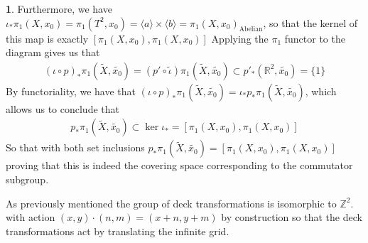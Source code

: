 \documentclass[10.5pt]{article}
\theoremstyle{definition}
\newtheorem{pb}{}
\newcommand{\set}[1]{\{#1\}}
\newcommand{\gen}[1]{\langle #1 \rangle}
\begin{document}
\begin{pb}
        Furthermore, we have \(\iota_*\pi_1(X,x_0) = \pi_1(T^2,x_0) = \gen{a} \times \gen{b} = \pi_1(X,x_0)_{\text{Abelian}}\), so that the kernel of this map is exactly \newline \([\pi_1(X,x_0),\pi_1(X,x_0)]\)
        Applying the \(\pi_1\) functor to the diagram gives us that
        \begin{align*}
            (\iota \circ p)_*\pi_1(\tilde{X},\tilde{x_0}) = (p'\circ \tilde{\iota})\pi_1(\tilde{X},\tilde{x_0}) \subset p'_* (\mathbb{R}^2,\tilde{x_0}) = \set{1}
        \end{align*}
        By functoriality, we have that \( (\iota \circ p)_*\pi_1(\tilde{X},\tilde{x_0}) = \iota_* p_* \pi_1(\tilde{X},\tilde{x_0})\), which allows us to conclude that
        \begin{align*}
            p_*\pi_1(\tilde{X},\tilde{x_0}) \subset \ker \iota_* = [\pi_1(X,x_0),\pi_1(X,x_0)]
        \end{align*}
        So that with both set inclusions \(p_*\pi_1(\tilde{X},\tilde{x_0}) = [\pi_1(X,x_0),\pi_1(X,x_0)]\) proving that this is indeed the covering space corresponding to the commutator subgroup.

        As previously mentioned the group of deck transformations is isomorphic to \(\mathbb{Z}^2\). with action \((x,y)\cdot (n,m) = (x+n,y+m)\) by construction so that the deck transformations act by translating the infinite grid.

    \end{pb}
\end{document}

